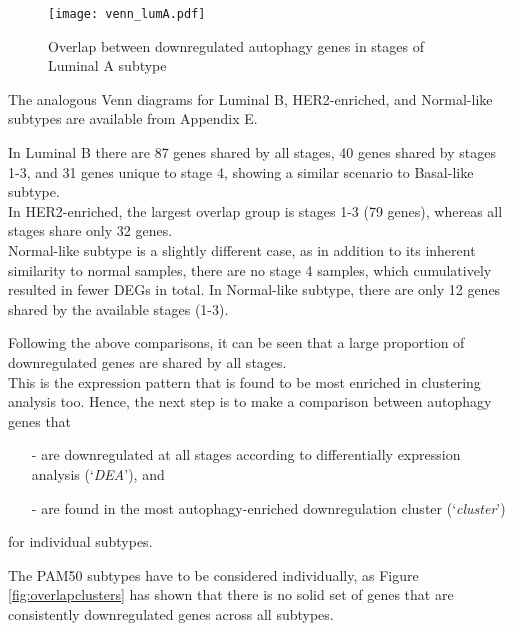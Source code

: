 \begin{wrapfigure}{L}{0.46\textwidth}
        \hfill
        \captionsetup{justification=centering}
        \centerline{ \texttt{[image: venn\_lumA.pdf]}}
        
        \vspace*{-4mm}
        \caption[Overlap between downregulated autophagy genes in stages of Luminal A subtype]{\label{fig:vennluma}Overlap between downregulated autophagy genes in stages of Luminal A subtype}
        \end{wrapfigure}
       

The analogous Venn diagrams for Luminal B, HER2-enriched, and Normal-like subtypes are available from Appendix E.

In Luminal B there are 87 genes shared by all stages, 40 genes shared by stages 1-3, and 31 genes unique to stage 4, showing a similar scenario to Basal-like subtype.\\In HER2-enriched, the largest overlap group is stages 1-3 (79 genes), whereas all stages share only 32 genes.\\Normal-like subtype is a slightly different case, as in addition to its inherent similarity to normal samples, there are no stage 4 samples, which cumulatively resulted in fewer DEGs in total. In Normal-like subtype, there are only 12 genes shared by the available stages (1-3). \\
\newline

\newpage
Following the above comparisons, it can be seen that a large proportion of downregulated genes are shared by all stages.\\ This is the expression pattern that is found to be most enriched in clustering analysis too. Hence, the next step is to make a comparison between autophagy genes that  \begin{itemize}
     \item[-] are downregulated at all stages according to differentially expression analysis (‘\textit{DEA}’),  and 
     \item[-] are found in the most autophagy-enriched downregulation cluster  (‘\textit{cluster}’)
\end{itemize}
for individual subtypes. 

The PAM50 subtypes have to be considered individually, as Figure \ref{fig:overlapclusters} has shown that there is no solid set of genes that are consistently downregulated genes across all subtypes.\\

